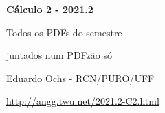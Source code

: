 \documentclass[oneside,12pt]{article}
\begin{document}

\def\u#1{\par{\footnotesize \url{#1}}}

\def\drafturl{http://angg.twu.net/LATEX/2021-2-C2.pdf}
\def\drafturl{http://angg.twu.net/2021.2-C2.html}
\def\draftfooter{\tiny \href{\drafturl}{\jobname{}} \ColorBrown{\shorttoday{} \hours}}



%

\thispagestyle{empty}

\begin{center}

\vspace*{1.2cm}

{\bf \Large Cálculo 2 - 2021.2}

\bsk

Todos os PDFs do semestre

juntados num PDFzão só

\bsk

Eduardo Ochs - RCN/PURO/UFF

\url{http://angg.twu.net/2021.2-C2.html}

\end{center}

\newpage

\def\incl#1{}


\incl{2021-2-C2-intro}

\incl{2021-2-C2-somas-1}

\incl{2021-2-C2-MT1}

\incl{2021-2-C2-MT2}

\incl{2021-2-C2-somas-2}
\end{document}
